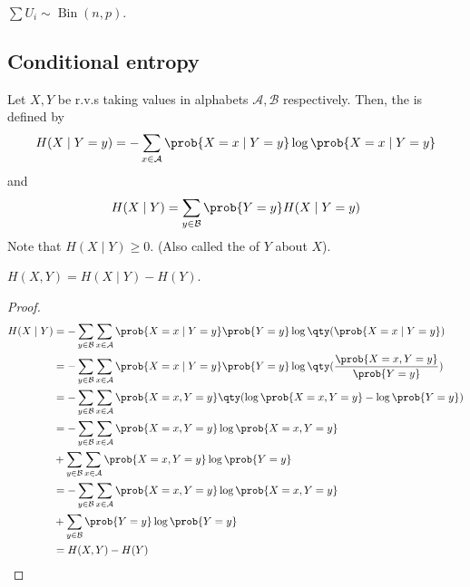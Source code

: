 \begin{remark}
    $\sum U_i \sim \operatorname{Bin}(n, p)$.
\end{remark}

\subsection{Conditional entropy}
\begin{definition}
    Let $X, Y$ be r.v.s taking values in alphabets $\mathcal A, \mathcal B$ respectively.
    Then, the  is defined by
    \begin{align*}
        H(X \mid Y = y) = - \sum_{x \in \mathcal A} \prob{X = x \mid Y = y} \log \prob{X = x \mid Y = y}
    \end{align*}
    and
    \begin{align*}
        H(X \mid Y) = \sum_{y \in \mathcal B} \prob{Y = y} H(X \mid Y = y)
    \end{align*}
    Note that $H(X \mid Y) \geq 0$. (Also called the  of $Y$ about $X$).
\end{definition}

\begin{lemma}
    $H(X,Y) = H(X \mid Y) - H(Y)$.
\end{lemma}

\begin{proof}
    \begin{align*}
        H(X \mid Y) &= -\sum_{y \in \mathcal B} \sum_{x \in \mathcal A} \prob{X = x \mid Y = y} \prob{Y = y} \log \qty(\prob{X = x \mid Y = y}) \\
        &= -\sum_{y \in \mathcal B} \sum_{x \in \mathcal A} \prob{X = x \mid Y = y} \prob{Y = y} \log \qty(\frac{\prob{X = x, Y = y}}{\prob{Y = y}}) \\
        &= -\sum_{y \in \mathcal B} \sum_{x \in \mathcal A} \prob{X = x, Y = y} \qty(\log \prob{X = x, Y = y} - \log \prob{Y = y}) \\
        &= -\sum_{y \in \mathcal B} \sum_{x \in \mathcal A} \prob{X = x, Y = y} \log \prob{X = x, Y = y} \\
        &+ \sum_{y \in \mathcal B} \sum_{x \in \mathcal A} \prob{X = x, Y = y} \log \prob{Y = y} \\
        &= -\sum_{y \in \mathcal B} \sum_{x \in \mathcal A} \prob{X = x, Y = y} \log \prob{X = x, Y = y} \\
        &+ \sum_{y \in \mathcal B} \prob{Y = y} \log \prob{Y = y} \\
        &= H(X,Y) - H(Y)
    \end{align*}
\end{proof}

